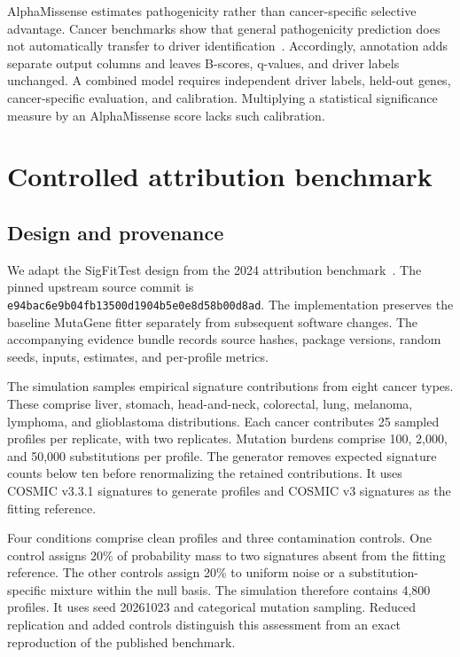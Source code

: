 \documentclass[11pt]{article}
\begin{document}
AlphaMissense estimates pathogenicity rather than cancer-specific selective advantage.
Cancer benchmarks show that general pathogenicity prediction does not automatically transfer to driver identification~\cite{canceram,mutapheno}.
Accordingly, annotation adds separate output columns and leaves B-scores, q-values, and driver labels unchanged.
A combined model requires independent driver labels, held-out genes, cancer-specific evaluation, and calibration.
Multiplying a statistical significance measure by an AlphaMissense score lacks such calibration.

\section{Controlled attribution benchmark}
\subsection{Design and provenance}
We adapt the SigFitTest design from the 2024 attribution benchmark~\cite{benchmark2024}.
The pinned upstream source commit is \texttt{e94bac6e9b04fb13500d1904b5e0e8d58b00d8ad}.
The implementation preserves the baseline MutaGene fitter separately from subsequent software changes.
The accompanying evidence bundle records source hashes, package versions, random seeds, inputs, estimates, and per-profile metrics.

The simulation samples empirical signature contributions from eight cancer types.
These comprise liver, stomach, head-and-neck, colorectal, lung, melanoma, lymphoma, and glioblastoma distributions.
Each cancer contributes 25 sampled profiles per replicate, with two replicates.
Mutation burdens comprise 100, 2,000, and 50,000 substitutions per profile.
The generator removes expected signature counts below ten before renormalizing the retained contributions.
It uses COSMIC v3.3.1 signatures to generate profiles and COSMIC v3 signatures as the fitting reference.

Four conditions comprise clean profiles and three contamination controls.
One control assigns 20\% of probability mass to two signatures absent from the fitting reference.
The other controls assign 20\% to uniform noise or a substitution-specific mixture within the null basis.
The simulation therefore contains 4,800 profiles.
It uses seed 20261023 and categorical mutation sampling.
Reduced replication and added controls distinguish this assessment from an exact reproduction of the published benchmark.
\end{document}
